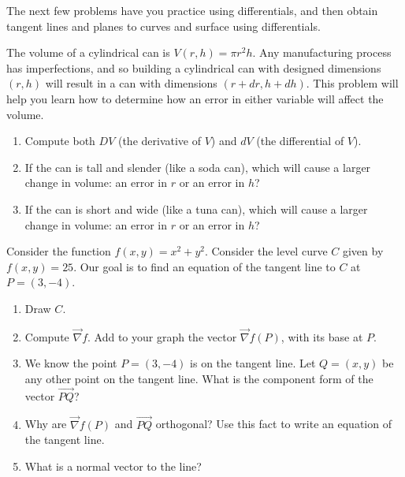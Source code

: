 The next few problems have you practice using differentials, and then obtain tangent lines and planes to curves and surface using differentials.

\begin{problem}
The volume of a cylindrical can is $V(r,h)=\pi r^2 h$. Any manufacturing process has imperfections, and so building a cylindrical can with designed dimensions $(r,h)$ will result in a can with dimensions $(r+dr,h+dh)$. This problem will help you learn how to determine how an error in either variable will affect the volume.
\begin{enumerate}
 \item Compute both $DV$ (the derivative of $V$) and $dV$ (the differential of $V$).
 \item If the can is tall and slender (like a soda can), which will cause a larger change in volume: an error in $r$ or an error in $h$? 
 \item If the can is short and wide (like a tuna can), which will cause a larger change in volume: an error in $r$ or an error in $h$?

\end{enumerate}
\end{problem}

\begin{problem}
 Consider the function $f(x,y)=x^2+y^2$.  Consider the level curve $C$ given by $f(x,y)=25$. Our goal is to find an equation of the tangent line to $C$ at $P=(3,-4)$.
 \begin{enumerate}
  \item Draw $C$.
  \item Compute $\vec \nabla f$. Add to your graph the vector $\vec \nabla f(P)$, with its base at $P$. 
  \item We know the point $P=(3,-4)$ is on the tangent line. Let $Q=(x,y)$ be any other point on the tangent line.  What is the component form of the vector $\vec {PQ}$?
  \item Why are  $\vec \nabla f(P)$ and $\vec{PQ}$ orthogonal? Use this fact to write an equation of the tangent line.
  \item What is a normal vector to the line?
 \end{enumerate}

\end{problem}

